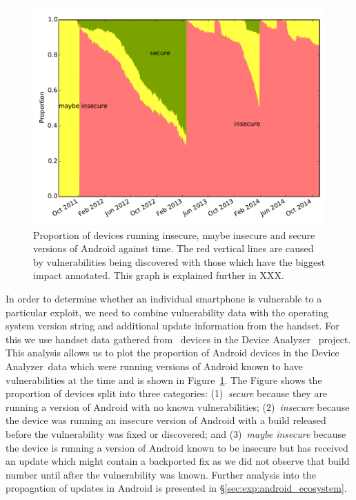 \documentclass[conference,a4paper,twoside]{IEEEtran}
\newcommand{\da}{Device Analyzer}
\begin{document}
\begin{figure}[h]
\centering
\includegraphics[width=\columnwidth]{figures/proportioninsecure}
\caption{Proportion of devices running insecure, maybe insecure and secure versions of Android against time.
The red vertical lines are caused by vulnerabilities being discovered with those which have the biggest impact annotated.
This graph is explained further in XXX.}
\label{fig:proportioninsecure}
\end{figure}

In order to determine whether an individual smartphone is vulnerable to a particular exploit, we need to combine vulnerability data with the operating system version string and additional update information from the handset. 
For this we use handset data gathered from \daNumOSDevices\ devices in the \da~\cite{Wagner2013} project.
This analysis allows us to plot the proportion of Android devices in the \da\ data which were running versions of Android known to have vulnerabilities at the time and is shown in Figure~\ref{fig:proportioninsecure}.
The Figure shows the proportion of devices split into three categories: 
(1)~\emph{secure} because they are running a version of Android with no known vulnerabilities; 
(2)~\emph{insecure} because the device was running an insecure version of Android with a build released before the vulnerability was fixed or discovered; and 
(3)~\emph{maybe insecure} because the device is running a version of Android known to be insecure but has received an update which might contain a backported fix as we did not observe that build number until after the vulnerability was known.
Further analysis into the propagation of updates in Android is presented in \S\ref{sec:exp:android_ecosystem}.
\end{document}
